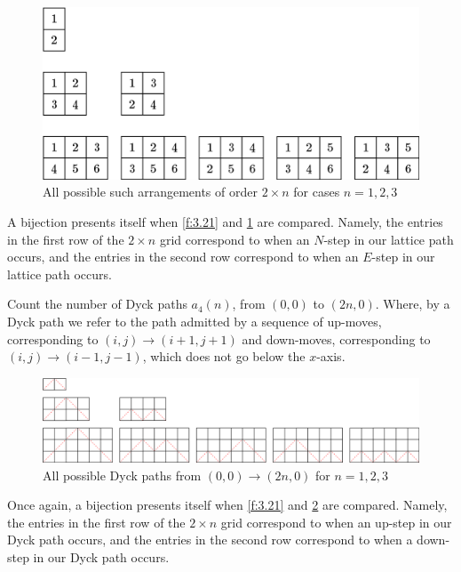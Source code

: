 \begin{solution}
\begin{figure}[H]
    \centering
    \includegraphics[width=0.8\linewidth]{Images/Figure12.png}
    \caption{All possible such arrangements of order $2\times n$ for cases $n=1,2,3$}
    \label{f:3.22}
\end{figure}
A bijection presents itself when \cref{f:3.21} and \cref{f:3.22} are compared. Namely, the entries in the first row of the $2\times n$ grid correspond to when an $N$-step in our lattice path occurs, and the entries in the second row correspond to when an $E$-step in our lattice path occurs.     
\end{solution}
\begin{question}
Count the number of Dyck paths $a_4(n)$, from $(0,0)$ to $(2n,0)$. Where, by a Dyck path we refer to the path admitted by a sequence of up-moves, corresponding to $(i,j)\to (i+1,j+1)$ and down-moves, corresponding to $(i,j)\to (i-1,j-1)$, which does not go below the $x$-axis.    
\end{question}
\begin{solution}
\begin{figure}[H]
    \centering
    \includegraphics[width=1.2\linewidth]{Images/Figure13.png}
    \caption{All possible Dyck paths from  $(0,0)\to (2n,0)$ for $n=1,2,3$}
    \label{f:3.23}
\end{figure}
Once again, a bijection presents itself when \cref{f:3.21} and \cref{f:3.23} are compared. Namely, the entries in the first row of the $2\times n$ grid correspond to when an up-step in our Dyck path occurs, and the entries in the second row correspond to when a down-step in our Dyck path occurs.     
\end{solution}
